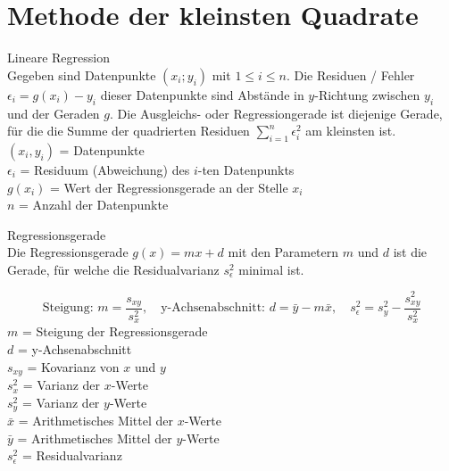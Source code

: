 \section{Methode der kleinsten Quadrate}
\begin{definition}{Lineare Regression}\\
Gegeben sind Datenpunkte $(x_i; y_i)$ mit $1 \leq i \leq n$. Die Residuen / Fehler $\epsilon_i=g(x_i)-y_i$ dieser Datenpunkte sind Abstände in $y$-Richtung zwischen $y_i$ und der Geraden $g$. Die Ausgleichs- oder Regressiongerade ist diejenige Gerade, für die die Summe der quadrierten Residuen $\sum_{i=1}^{n} \epsilon_i^2$ am kleinsten ist.\\
$(x_i, y_i)$ = Datenpunkte\\
$\epsilon_i$ = Residuum (Abweichung) des $i$-ten Datenpunkts\\
$g(x_i)$ = Wert der Regressionsgerade an der Stelle $x_i$\\
$n$ = Anzahl der Datenpunkte\\
\end{definition}

\begin{theorem}{Regressionsgerade}\\
Die Regressionsgerade $g(x)=mx+d$ mit den Parametern $m$ und $d$ ist die Gerade, für welche die Residualvarianz $s_{\epsilon}^2$ minimal ist.

$$
\text{Steigung: } m=\frac{s_{xy}}{s_x^2}, \quad \text{y-Achsenabschnitt: } d=\bar{y}-m\bar{x}, \quad s_{\epsilon}^2=s_y^2-\frac{s_{xy}^2}{s_x^2}
$$
$m$ = Steigung der Regressionsgerade\\
$d$ = y-Achsenabschnitt\\
$s_{xy}$ = Kovarianz von $x$ und $y$\\
$s_x^2$ = Varianz der $x$-Werte\\
$s_y^2$ = Varianz der $y$-Werte\\
$\bar{x}$ = Arithmetisches Mittel der $x$-Werte\\
$\bar{y}$ = Arithmetisches Mittel der $y$-Werte\\
$s_{\epsilon}^2$ = Residualvarianz\\
\end{theorem}

